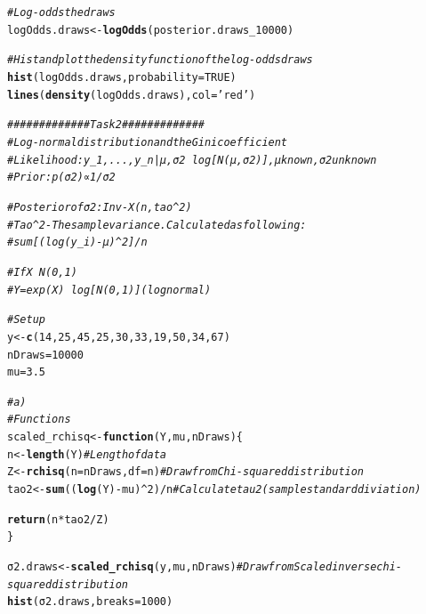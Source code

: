 \documentclass{article}\usepackage[]{graphicx}\usepackage[]{color}
\makeatletter
\newcommand{\hlnum}[1]{\textcolor[rgb]{0.686,0.059,0.569}{#1}}%
\newcommand{\hlstr}[1]{\textcolor[rgb]{0.192,0.494,0.8}{#1}}%
\newcommand{\hlcom}[1]{\textcolor[rgb]{0.678,0.584,0.686}{\textit{#1}}}%
\newcommand{\hlopt}[1]{\textcolor[rgb]{0,0,0}{#1}}%
\newcommand{\hlstd}[1]{\textcolor[rgb]{0.345,0.345,0.345}{#1}}%
\newcommand{\hlkwa}[1]{\textcolor[rgb]{0.161,0.373,0.58}{\textbf{#1}}}%
\newcommand{\hlkwb}[1]{\textcolor[rgb]{0.69,0.353,0.396}{#1}}%
\newcommand{\hlkwc}[1]{\textcolor[rgb]{0.333,0.667,0.333}{#1}}%
\newcommand{\hlkwd}[1]{\textcolor[rgb]{0.737,0.353,0.396}{\textbf{#1}}}%
\newenvironment{kframe}{%
 \def\at@end@of@kframe{}%
 \ifinner\ifhmode%
  \def\at@end@of@kframe{\end{minipage}}%
  \begin{minipage}{\columnwidth}%
 \fi\fi%
 \def\FrameCommand##1{\hskip\@totalleftmargin \hskip-\fboxsep
 \colorbox{shadecolor}{##1}\hskip-\fboxsep
     \hskip-\linewidth \hskip-\@totalleftmargin \hskip\columnwidth}%
 \MakeFramed {\advance\hsize-\width
   \@totalleftmargin\z@ \linewidth\hsize
   \@setminipage}}%
 {\par\unskip\endMakeFramed%
 \at@end@of@kframe}
\newenvironment{knitrout}{}{} %
\makeatother
\begin{document}
\begin{knitrout}
\begin{kframe}
\begin{alltt}
\hlcom{# Log-odds the draws}
\hlstd{logOdds.draws} \hlkwb{<-}\hlkwd{logOdds}\hlstd{(posterior.draws_10000)}

\hlcom{# Hist and plot the density function of the log-odds draws}
\hlkwd{hist}\hlstd{(logOdds.draws,} \hlkwc{probability} \hlstd{=} \hlnum{TRUE}\hlstd{)}
\hlkwd{lines}\hlstd{(}\hlkwd{density}\hlstd{(logOdds.draws),} \hlkwc{col} \hlstd{=} \hlstr{'red'}\hlstd{)}

\hlcom{############# Task 2 #############}
\hlcom{# Log-normal distribution and the Gini coefficient}
\hlcom{# Likelihood: y_1, ..., y_n | µ, σ2 ~ log[ N(µ, σ2) ], µ known, σ2 unknown}
\hlcom{# Prior: p(σ2) ∝ 1/σ2}

\hlcom{# Posterior of σ2: Inv-X(n, tao^2)}
\hlcom{# Tao^2 - The sample variance. Calculated as following:}
\hlcom{# sum[ (log(y_i) - µ)^2 ]/n}

\hlcom{# If X ~ N(0, 1)}
\hlcom{# Y = exp(X) ~ log[ N(0,1) ] (lognormal)}

\hlcom{# Setup}
\hlstd{y} \hlkwb{<-} \hlkwd{c}\hlstd{(}\hlnum{14}\hlstd{,} \hlnum{25}\hlstd{,} \hlnum{45}\hlstd{,} \hlnum{25}\hlstd{,} \hlnum{30}\hlstd{,} \hlnum{33}\hlstd{,} \hlnum{19}\hlstd{,} \hlnum{50}\hlstd{,} \hlnum{34}\hlstd{,} \hlnum{67}\hlstd{)}
\hlstd{nDraws} \hlkwb{=} \hlnum{10000}
\hlstd{mu} \hlkwb{=} \hlnum{3.5}

\hlcom{# a)}
\hlcom{# Functions}
\hlstd{scaled_rchisq} \hlkwb{<-} \hlkwa{function}\hlstd{(}\hlkwc{Y}\hlstd{,} \hlkwc{mu}\hlstd{,} \hlkwc{nDraws}\hlstd{) \{}
  \hlstd{n} \hlkwb{<-} \hlkwd{length}\hlstd{(Y)} \hlcom{# Length of data}
  \hlstd{Z} \hlkwb{<-} \hlkwd{rchisq}\hlstd{(}\hlkwc{n} \hlstd{= nDraws,} \hlkwc{df} \hlstd{= n)} \hlcom{# Draw from Chi-squared distribution}
  \hlstd{tao2} \hlkwb{<-} \hlkwd{sum}\hlstd{((}\hlkwd{log}\hlstd{(Y)} \hlopt{-} \hlstd{mu)}\hlopt{^}\hlnum{2}\hlstd{)}\hlopt{/}\hlstd{n} \hlcom{# Calculate tau2 (sample standard diviation)}

  \hlkwd{return} \hlstd{(n}\hlopt{*}\hlstd{tao2}\hlopt{/}\hlstd{Z)}
\hlstd{\}}

\hlstd{σ2.draws} \hlkwb{<-} \hlkwd{scaled_rchisq}\hlstd{(y, mu, nDraws)} \hlcom{# Draw from Scaled inverse chi-squared distribution}
\hlkwd{hist}\hlstd{(σ2.draws,} \hlkwc{breaks}\hlstd{=}\hlnum{1000}\hlstd{)}
\end{alltt}


{\ttfamily\noindent\color{warningcolor}{\#\# Warning in title(main = main, sub = sub, xlab = xlab, ylab = ylab, ...): conversion failure on 'Histogram of σ2.draws' in 'mbcsToSbcs': dot substituted for <cf>}}


\end{kframe}
\end{knitrout}
\end{document}
